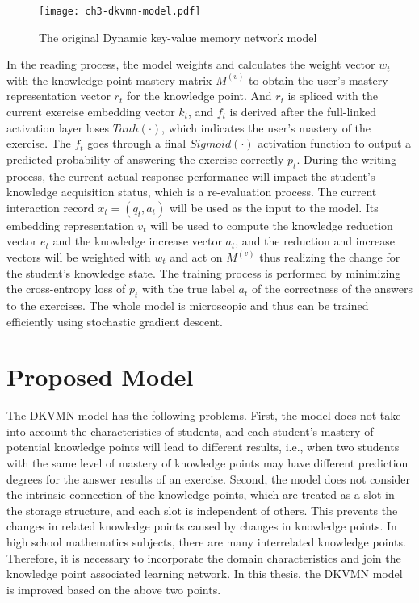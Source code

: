 \begin{figure}[htbp!]
    \texttt{[image: ch3-dkvmn-model.pdf]}
    \caption{The original Dynamic key-value memory network model}\label{fig:ch3-dkvmn-model}
\end{figure}

In the reading process, the model weights and calculates the weight vector \(w_t\) with the knowledge point mastery matrix \(M^{(v)}\) to obtain the user's mastery representation vector \(r_t\) for the knowledge point. And \(r_t\) is spliced with the current exercise embedding vector \(k_t\), and \(f_t\) is derived after the full-linked activation layer loses \(Tanh(\cdot)\), which indicates the user's mastery of the exercise. The \(f_t\) goes through a final \(Sigmoid(\cdot)\) activation function to output a predicted probability of answering the exercise correctly \(p_t\). During the writing process, the current actual response performance will impact the student's knowledge acquisition status, which is a re-evaluation process. The current interaction record \(x_t=(q_t,a_t)\) will be used as the input to the model. Its embedding representation \(v_t\) will be used to compute the knowledge reduction vector \(e_t\) and the knowledge increase vector \(a_t\), and the reduction and increase vectors will be weighted with \(w_t\) and act on \(M^{(v)}\) thus realizing the change for the student's knowledge state. The training process is performed by minimizing the cross-entropy loss of \(p_t\) with the true label \(a_t\) of the correctness of the answers to the exercises. The whole model is microscopic and thus can be trained efficiently using stochastic gradient descent.

\section{Proposed Model}

The DKVMN model has the following problems. First, the model does not take into account the characteristics of students, and each student's mastery of potential knowledge points will lead to different results, i.e., when two students with the same level of mastery of knowledge points may have different prediction degrees for the answer results of an exercise. Second, the model does not consider the intrinsic connection of the knowledge points, which are treated as a slot in the storage structure, and each slot is independent of others. This prevents the changes in related knowledge points caused by changes in knowledge points. In high school mathematics subjects, there are many interrelated knowledge points. Therefore, it is necessary to incorporate the domain characteristics and join the knowledge point associated learning network. In this thesis, the DKVMN model is improved based on the above two points.

